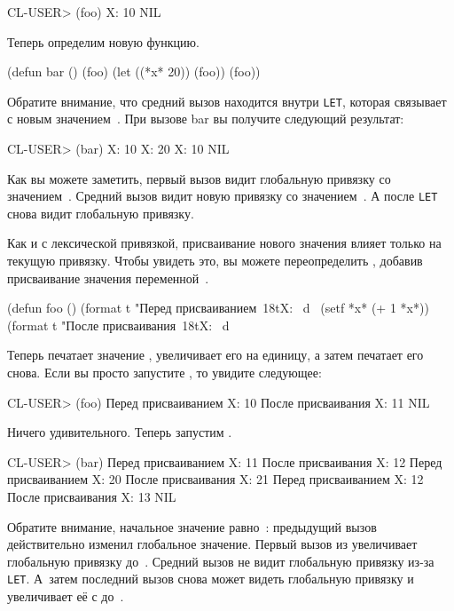 \begin{myverb}
  CL-USER> (foo)
  X: 10
  NIL
\end{myverb}

Теперь определим новую функцию.

\begin{myverb}
  (defun bar ()
    (foo)
    (let ((*x* 20)) (foo))
    (foo))
\end{myverb}

Обратите внимание, что средний вызов  находится внутри \lstinline{LET}, которая связывает
 с новым значением~. При вызове bar вы получите следующий результат:

\begin{myverb}
  CL-USER> (bar)
  X: 10
  X: 20
  X: 10
  NIL
\end{myverb}

Как вы можете заметить, первый вызов  видит глобальную привязку со
значением~. Средний вызов видит новую привязку со значением~. А после
\lstinline{LET}  снова видит глобальную привязку.

Как и с лексической привязкой, присваивание нового значения влияет только на текущую
привязку. Чтобы увидеть это, вы можете переопределить , добавив присваивание значения
переменной~.

\begin{myverb}
  (defun foo ()
    (format t "Перед присваиванием~18tX: ~d~%
    (setf *x* (+ 1 *x*))
    (format t "После присваивания~18tX: ~d~%
\end{myverb}

Теперь  печатает значение , увеличивает его на единицу, а затем
печатает его снова. Если вы просто запустите , то увидите следующее:

\begin{myverb}
  CL-USER> (foo)
  Перед присваиванием X: 10
  После присваивания  X: 11
  NIL
\end{myverb}

Ничего удивительного. Теперь запустим .

\begin{myverb}
  CL-USER> (bar)
  Перед присваиванием X: 11
  После присваивания  X: 12
  Перед присваиванием X: 20
  После присваивания  X: 21
  Перед присваиванием X: 12
  После присваивания  X: 13
  NIL
\end{myverb}

Обратите внимание, начальное значение  равно~: предыдущий вызов
 действительно изменил глобальное значение. Первый вызов  из
 увеличивает глобальную привязку до~. Средний вызов не видит глобальную
привязку из-за \lstinline{LET}. А~затем последний вызов снова может видеть глобальную
привязку и увеличивает её с  до~.

